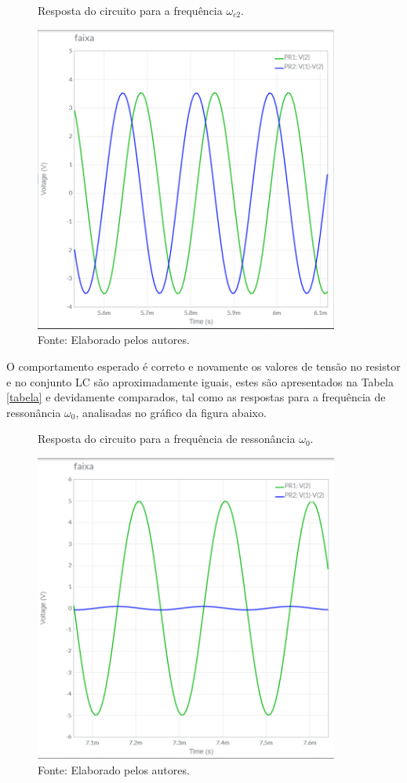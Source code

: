 \begin{figure}[H]
	\centering
	\caption{Resposta do circuito para a frequência $\omega_{c2}$.}
	\includegraphics[width=10cm]{imagens/f_c2.png}
	\caption*{Fonte: Elaborado pelos autores.}
	\label{c2}
\end{figure}

O comportamento esperado é correto e novamente os valores de tensão no resistor e no conjunto LC são aproximadamente iguais, estes são apresentados na Tabela \ref{tabela} e devidamente comparados, tal como as respostas para a frequência de ressonância $\omega_0$, analisadas no gráfico da figura abaixo.

\begin{figure}[H]
	\centering
	\caption{Resposta do circuito para a frequência de ressonância $\omega_0$.}
	\includegraphics[width=10cm]{imagens/f_ressonancia.png}
	\caption*{Fonte: Elaborado pelos autores.}
	\label{ressonancia}
\end{figure}

